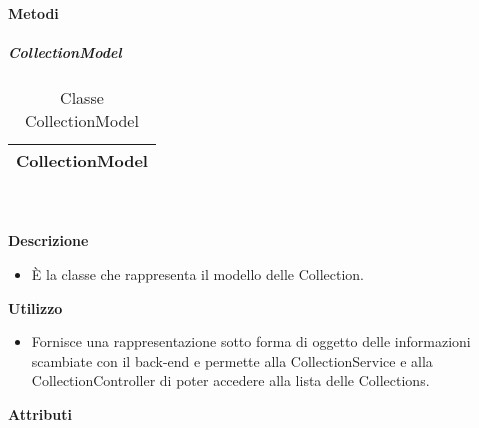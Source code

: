 		\textbf{Metodi} 
	\begin{itemize}
		\end{itemize}
			\subparagraph{CollectionModel} 
\begin{table}[ht]
\begin{center}
\bgroup
	\setlength{\arrayrulewidth}{0.6mm}
	\def\arraystretch{1}
		\begin{tabular}{ | p{12cm} | }
				\hline  
					\centerline{\textbf{CollectionModel}}
		\\ \hline 
				\hline
				\hline
		
		\end{tabular}
\egroup
\caption{Classe CollectionModel}
\end{center}
\end{table}  \textbf{\\ \\ Descrizione} 
					\begin{itemize}
						\item[] È la classe che rappresenta il modello delle Collection.
					\end{itemize}      
				\textbf{Utilizzo}  
					\begin{itemize}
						\item[] Fornisce una rappresentazione sotto forma di oggetto delle informazioni scambiate con il back-end e permette alla CollectionService e alla CollectionController di poter accedere alla lista delle Collections.
					\end{itemize}
			 \textbf{Attributi} 
	\begin{itemize}
		\end{itemize}
		

